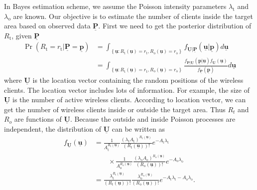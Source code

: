 In Bayes estimation scheme, we assume the Poisson intensity parameters $\lambda_{\mathrm{t}}$ and $\lambda_{\mathrm{o}}$ are known. Our objective is to estimate the number of clients inside the target area based on observed data $\underline{\mathbf{P}}$. First we need to get the posterior distribution of $R_{\mathrm{t}}$, given $\underline{\mathbf{P}}$
\begin{equation} \label{equation:PosdistRt}
\begin{split}
\Pr \left( R_{\mathrm{t}} = r_{\mathrm{t}}
| \underline{\mathbf{P}} = \underline{\mathbf{p}} \right)
&= \int_{ \left\{ \underline{\mathbf{u}}
	: R_{\mathrm{t}}(\underline{\mathbf{u}}) = r_{\mathrm{t}},
	R_{\mathrm{o}}(\underline{\mathbf{u}}) = r_{\mathrm{o}}
	\right\} }
f_{\underline{\mathbf{U}} | \underline{\mathbf{P}}}
\left( \underline{\mathbf{u}} | \underline{\mathbf{p}} \right)
d\underline{\mathbf{u}} \\
&= \int_{ \left\{ \underline{\mathbf{u}}
	: R_{\mathrm{t}}(\underline{\mathbf{u}}) = r_{\mathrm{t}},
	R_{\mathrm{o}}(\underline{\mathbf{u}}) = r_{\mathrm{o}} \right\} }
\frac{ f_{\underline{\mathbf{P}} | \underline{\mathbf{U}}}
	\left( \underline{\mathbf{p}} | \underline{\mathbf{u}} \right)
	f_{\underline{\mathbf{U}}} (\underline{\mathbf{u}}) }
{ f_{\underline{\mathbf{P}}} \left( \underline{\mathbf{p}} \right) }
d\underline{\mathbf{u}} 
\end{split}
\end{equation}
where $\underline{\mathbf{U}}$ is the location vector containing the random positions of the wireless clients. The location vector includes lots of information. For example, the size of $\underline{\mathbf{U}}$ is the number of active wireless clients. According to location vector, we can get the number of wireless clients inside or outside the target area. Thus $R_{t}$ and $R_{o}$ are functions of $\underline{\mathbf{U}}$.
Because the outside and inside Poisson processes are independent, the distribution of $\underline{\mathbf{U}}$ can be written as
\begin{equation} \label{equation:distU}
\begin{split}
f_{\underline{\mathbf{U}}} ( \underline{\mathbf{u}} )
&= \frac{1}{A_{\mathrm{t}}^{R_{\mathrm{t}}(\underline{\mathbf{u}})}}
\frac{ ( \lambda_{\mathrm{t}}
	A_{\mathrm{t}} )^{R_{\mathrm{t}}(\underline{\mathbf{u}})} }
{ ( R_{\mathrm{t}}(\underline{\mathbf{u}}) )! }
e^{- A_{\mathrm{t}} \lambda_{\mathrm{t}}} \\
&\qquad \times
\frac{1}{A_{\mathrm{o}}^{R_{\mathrm{o}}(\underline{\mathbf{u}})}}
\frac{ ( \lambda_{\mathrm{o}}
	A_{\mathrm{o}} )^{R_{\mathrm{o}}(\underline{\mathbf{u}})} }
{ ( R_{\mathrm{o}}(\underline{\mathbf{u}}) )! }
e^{- A_{\mathrm{o}} \lambda_{\mathrm{o}}} \\
&= \frac{ \lambda_{\mathrm{t}}^{R_{\mathrm{t}}(\underline{\mathbf{u}})} }
{ ( R_{\mathrm{t}}(\underline{\mathbf{u}}) )! }
\frac{ \lambda_{\mathrm{o}}^{R_{\mathrm{o}}(\underline{\mathbf{u}})} }
{ ( R_{\mathrm{o}}(\underline{\mathbf{u}}) )! }
e^{- A_{\mathrm{t}} \lambda_{\mathrm{t}}
	- A_{\mathrm{o}} \lambda_{\mathrm{o}}} .
\end{split}
\end{equation}
